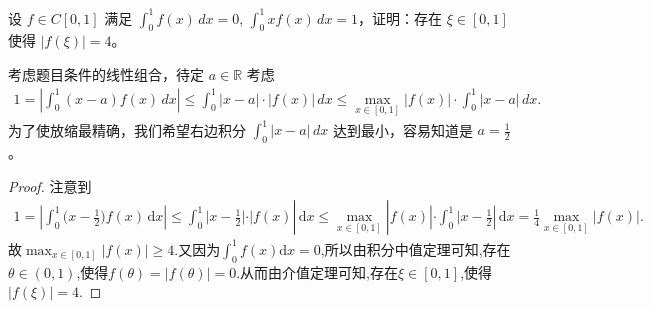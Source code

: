 \documentclass[../../main.tex]{subfiles}
\begin{document}
\begin{example}
设 $f \in C[0,1]$ 满足 $\int_0^1 f(x) \, dx = 0$, $\int_0^1 xf(x) \, dx = 1$，证明：存在 $\xi \in [0,1]$ 使得 $|f(\xi)| = 4$。
\end{example}
\begin{note}
考虑题目条件的线性组合，待定 $a \in \mathbb{R}$ 考虑
\begin{align*}
1 = \left| \int_0^1 (x - a)f(x) \, dx \right| \leq \int_0^1 |x - a| \cdot |f(x)| \, dx \leq \max_{x \in [0,1]} |f(x)| \cdot \int_0^1 |x - a| \, dx.
\end{align*}
为了使放缩最精确，我们希望右边积分 $\int_0^1 |x - a| \, dx$ 达到最小，容易知道是 $a = \frac{1}{2}$。
\end{note}
\begin{proof}
注意到
\begin{align*}
1=\left| \int_0^1{(x}-\frac{1}{2})f(x)\,\mathrm{d}x \right|\le \int_0^1{|x}-\frac{1}{2}|\cdot |f(x)|\,\mathrm{d}x\le \max_{x\in [0,1]} |f(x)|\cdot \int_0^1{|x}-\frac{1}{2}|\,\mathrm{d}x=\frac{1}{4}\max_{x\in [0,1]} |f(x)|.
\end{align*}
故$\max_{x\in [0,1]} |f(x)|\geqslant 4$.又因为$\int_0^1{f(x) \mathrm{d}x}=0$,所以由积分中值定理可知,存在$\theta \in (0,1)$,使得$f(\theta) =\left| f(\theta) \right|=0$.从而由介值定理可知,存在$\xi \in [0,1]$,使得$\left| f(\xi) \right|=4$.
\end{proof}
\end{document}
